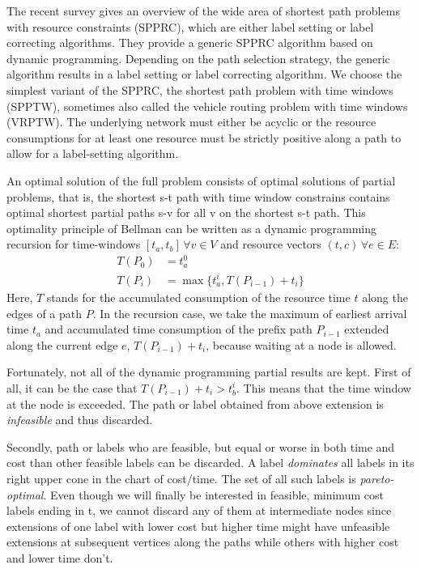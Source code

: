The recent survey \cite{irnich2005shortest} gives an overview of the wide area of shortest path problems with resource constraints (SPPRC), which are either label setting or label correcting algorithms. They provide a generic SPPRC algorithm based on dynamic programming. Depending on the path selection strategy, the generic algorithm results in a label setting or label correcting algorithm. We choose the simplest variant of the SPPRC, the shortest path problem with time windows (SPPTW), sometimes also called the vehicle routing problem with time windows (VRPTW). The underlying network must either be acyclic or the resource consumptions for at least one resource must be strictly positive along a path to allow for a label-setting algorithm. 

An optimal solution of the full problem consists of optimal solutions of partial problems, that is, the shortest s-t path with time window constrains contains optimal shortest partial paths s-v for all v on the shortest s-t path. This optimality principle of Bellman \cite{bellman1957dynamic} can be written as a dynamic programming recursion for time-windows $[t_a,t_b] \, \forall v \in V$ and resource vectors $(t,c) \, \forall e \in E$:
\begin{align*}
	T(P_0) &= t_a^0 \\
	T(P_i) &= \max\{t_a^i, T(P_{i-1}) + t_i\}
\end{align*}
Here, $T$ stands for the accumulated consumption of the resource time $t$ along the edges of a path $P$. In the recursion case, we take the maximum of earliest arrival time $t_a$ and accumulated time consumption of the prefix path $P_{i-1}$ extended along the current edge $e$, $T(P_{i-1}) + t_i$, because waiting at a node is allowed.

Fortunately, not all of the dynamic programming partial results are kept. First of all, it can be the case that $T(P_{i-1}) + t_i > t_b^i$. This means that the time window at the node is exceeded. The path or label obtained from above extension is \textit{infeasible} and thus discarded.

Secondly, path or labels who are feasible, but equal or worse in both time and cost than other feasible labels can be discarded. A label \textit{dominates} all labels in its right upper cone in the chart of cost/time. The set of all such labels is \textit{pareto-optimal}. Even though we will finally be interested in feasible, minimum cost labels ending in t, we cannot discard any of them at intermediate nodes since extensions of one label with lower cost but higher time might have unfeasible extensions at subsequent vertices along the paths while others with higher cost and lower time don't. 


